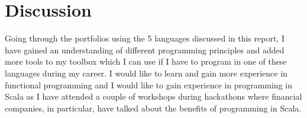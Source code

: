 \section*{Discussion}
Going through the portfolios using the 5 languages discussed in this report, I have gained an understanding of different programming principles and added more tools to my toolbox which I can use if I have to program in one of these languages during my career. I would like to learn and gain more experience in functional programming and I would like to gain experience in programming in Scala as I have attended a couple of workshops during hackathons where financial companies, in particular, have talked about the benefits of programming in Scala.